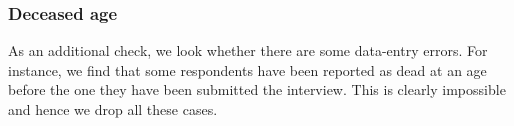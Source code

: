 \documentclass[\main/main.tex]{subfiles}
\begin{document}
\subsubsection{Deceased age}
As an additional check, we look whether there are some data-entry errors. For instance, we find that some respondents have been reported as dead at an age before the one they have been submitted the interview. This is clearly impossible and hence we drop all these cases.
\end{document}
